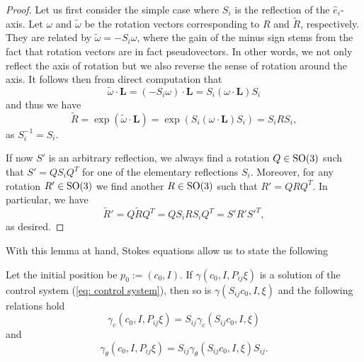 \begin{proof}
Let us first consider the simple case where $S_i$ is the reflection of the $\hat{e}_i$-axis. Let $\omega$ and $\tilde{\omega}$ be the rotation vectors corresponding to $R$ and $\tilde{R}$, respectively. They are related by $\tilde{\omega} = -S_i \omega$, where the gain of the minus sign stems from the fact that rotation vectors are in fact pseudovectors. In other words, we not only reflect the axis of rotation but we also reverse the sense of rotation around the axis. It follows then from direct computation that
\begin{equation}
\label{eq: transformation of rotation axis}
 \tilde{\omega} \cdot \mathbf{L} = (-S_i\omega) \cdot \mathbf{L} = S_i(\omega \cdot \mathbf{L})S_i
\end{equation}
and thus we have
\begin{equation}
\tilde{R} = \exp(\tilde{\omega} \cdot \mathbf{L}) = \exp(S_i(\omega \cdot \mathbf{L})S_i) = S_iRS_i,
\end{equation}
as $S_i^{-1} = S_i$.

If now $S'$ is an arbitrary reflection, we always find a rotation $Q \in \operatorname{SO}(3)$ such that $S' = Q S_i Q^T$ for one of the elementary reflections $S_i$. Moreover, for any rotation $R' \in \operatorname{SO}(3)$ we find another $R \in \operatorname{SO}(3)$ such that $R' = Q R Q^T$. In particular, we have
\begin{equation}
\tilde{R}' = Q \tilde{R} Q^T = Q S_iRS_i Q^T = S' R' S'^T,
\end{equation}
as desired.
\end{proof}

With this lemma at hand, Stokes equations allow us to state the following

\begin{condition}
\label{cond:swap}
Let the initial position be $p_0 := (c_0, I)$. If $\gamma(c_0, I, P_{ij} \xi)$ is a solution of the control system (\ref{eq: control system}), then so is $\gamma(S_{ij}c_0, I, \xi)$ and the following relations hold
\begin{equation}
	\gamma_c(c_0, I, P_{ij} \xi) = S_{ij} \gamma_c(S_{ij}c_0, I, \xi)
\end{equation}
and
\begin{equation}
	\gamma_{\theta}(c_0, I, P_{ij} \xi ) = S_{ij} \gamma_{\theta} (S_{ij} c_0, I, \xi) S_{ij}.
\end{equation}
\end{condition}


